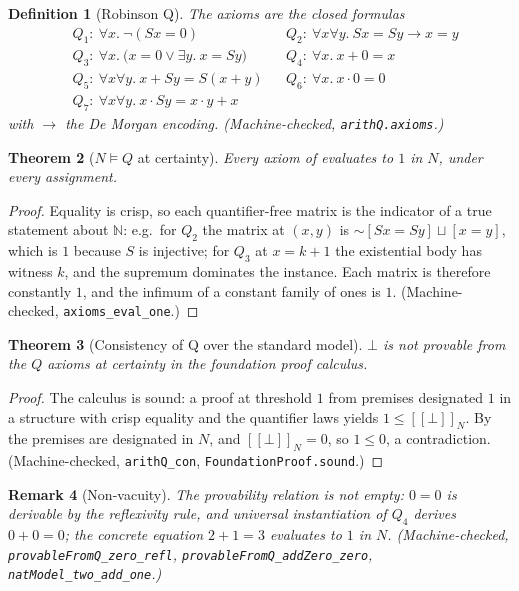 \documentclass[11pt,a4paper]{article}
\newtheorem{theorem}{Theorem}[section]
\newtheorem{definition}[theorem]{Definition}
\newtheorem{remark}[theorem]{Remark}
\newcommand{\negc}{\mathord{\sim}}
\newcommand{\disjc}{\sqcup}
\newcommand{\Nat}{\mathbb{N}}
\newcommand{\evalc}[2]{[\![ {#2} ]\!]_{#1}}
\begin{document}
\begin{definition}[Robinson Q]
\label{def:robinson-q}
The axioms are the closed formulas
\begin{align*}
  &Q_1:\ \forall x.\ \neg(Sx = 0)
  &&Q_2:\ \forall x \forall y.\ Sx = Sy \to x = y\\
  &Q_3:\ \forall x.\ \bigl(x = 0 \vee \exists y.\ x = Sy\bigr)
  &&Q_4:\ \forall x.\ x + 0 = x\\
  &Q_5:\ \forall x \forall y.\ x + Sy = S(x + y)
  &&Q_6:\ \forall x.\ x \cdot 0 = 0\\
  &Q_7:\ \forall x \forall y.\ x \cdot Sy = x \cdot y + x
\end{align*}
with $\to$ the De Morgan encoding.
(Machine-checked, \texttt{arithQ.axioms}.)
\end{definition}

\begin{theorem}[$N \models Q$ at certainty]
\label{thm:axioms-one}
Every axiom of  evaluates to $1$ in $N$, under
every assignment.
\end{theorem}
\begin{proof}
Equality is crisp, so each quantifier-free matrix is the indicator of
a true statement about $\Nat$: e.g.\ for $Q_2$ the matrix at $(x,y)$ is
$\negc[Sx = Sy] \disjc [x = y]$, which is $1$ because $S$ is injective;
for $Q_3$ at $x = k+1$ the existential body has witness $k$, and the
supremum dominates the instance.
Each matrix is therefore constantly $1$, and the infimum of a constant
family of ones is $1$.
(Machine-checked, \texttt{axioms\_eval\_one}.)
\end{proof}

\begin{theorem}[Consistency of Q over the standard model]
\label{thm:q-con}
$\bot$ is not provable from the $Q$ axioms at certainty in the
foundation proof calculus.
\end{theorem}
\begin{proof}
The calculus is sound: a proof at threshold $1$ from premises
designated $1$ in a structure with crisp equality and the quantifier
laws yields $1 \leq \evalc{N}{\bot}$.
By  the premises are designated in $N$, and
$\evalc{N}{\bot} = 0$, so $1 \leq 0$, a contradiction.
(Machine-checked, \texttt{arithQ\_con},
\texttt{FoundationProof.sound}.)
\end{proof}

\begin{remark}[Non-vacuity]
The provability relation is not empty: $0 = 0$ is derivable by the
reflexivity rule, and universal instantiation of $Q_4$ derives
$0 + 0 = 0$; the concrete equation $2 + 1 = 3$ evaluates to $1$ in
$N$.
(Machine-checked, \texttt{provableFromQ\_zero\_refl},
\texttt{provableFromQ\_addZero\_zero}, \texttt{natModel\_two\_add\_one}.)
\end{remark}
\end{document}
